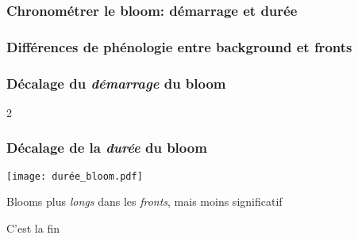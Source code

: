 \documentclass[11pt, french]{beamer}
\begin{document}
\begin{frame}
  \frametitle{Chronométrer le bloom: démarrage et durée}
\end{frame}

\begin{frame}
  \frametitle{Différences de phénologie entre background et fronts}
\end{frame}

\begin{frame}
  \frametitle{Décalage du \emph{\textit{démarrage}} du bloom}

  \begin{overlayarea}{\textwidth}{2\baselineskip}

  \end{overlayarea}
\end{frame}

\begin{frame}
  \frametitle{Décalage de la \emph{\textit{durée}} du bloom}
  \texttt{[image: durée\_bloom.pdf]}

  Blooms plus \emph{longs} dans les \emph{fronts}, mais moins significatif
\end{frame}

\begin{frame}
  C'est la fin
\end{frame}
\end{document}
